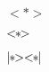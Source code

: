 \documentclass[12pt]{report}
\begin{document}


$<*>$

\ensuremath{\mathbin{\text{<}\mkern-1.5mu\mathord{*}\mkern-1.5mu\text{>}}}

\ensuremath{\mathbin{\mathord{|}\mkern-1.5mu\mathord{*}\mkern-1.5mu\text{><}\mkern-1.5mu\mathord{*}\mkern-1.5mu\mathord{|}}}
\end{document}
